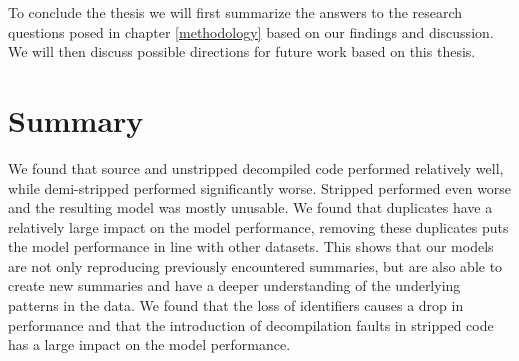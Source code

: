 To conclude the thesis we will first summarize the answers to the research questions posed in chapter \ref{methodology} based on our findings and discussion. We will then discuss possible directions for future work based on this thesis. 
\section{Summary}


We found that source and unstripped decompiled code performed relatively well, while demi-stripped performed significantly worse. Stripped performed even worse and the resulting model was mostly unusable. We found that duplicates have a relatively large impact on the model performance, removing these duplicates puts the model performance in line with other datasets. This shows that our models are not only reproducing previously encountered summaries, but are also able to create new summaries and have a deeper understanding of the underlying patterns in the data. We found that the loss of identifiers causes a drop in performance and that the introduction of decompilation faults in stripped code has a large impact on the model performance.

